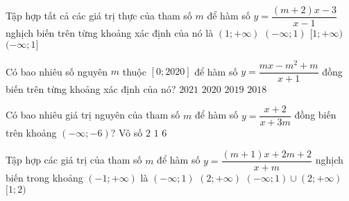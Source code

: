 \begin{ex}%
    Tập hợp tất cả các giá trị thực của tham số $m$ để hàm số $y=\dfrac{(m+2)x-3}{x-1}$ nghịch biến trên từng khoảng xác định của nó là
    \choice
    {\True $(1;+\infty)$}
    {$(-\infty;1)$}
    {$[1;+\infty)$}
    {$(-\infty;1]$}
\end{ex}
\begin{ex}%
    Có bao nhiêu số nguyên $m$ thuộc $[0;2020]$ để hàm số $y=\dfrac{mx-m^2+m}{x+1}$ đồng biến trên từng khoảng xác định của nó?
    \choice
    {$2021$}
    {\True $2020$}
    {$2019$}
    {$2018$}
\end{ex}
\begin{ex}%
    Có bao nhiêu giá trị nguyên của tham số $m$ để
    hàm số $y=\dfrac{x+2}{x+3m}$ đồng biến trên khoảng $(-\infty;-6)$?
    \choice
    {Vô số}
    {\True $2$}
    {$1$}
    {$6$}
\end{ex}
\begin{ex}%
    Tập hợp các giá trị của tham số $m$ để hàm số $y=\dfrac{(m+1)x+2m+2}{x+m}$ nghịch biến trong khoảng $(-1;+\infty)$ là
    \choice
    {$(-\infty;1)$}
    {$(2;+\infty)$}
    {$(-\infty;1) \cup (2;+\infty)$}
    {\True $[1;2)$}
    \loigiai{
        Tập xác định $\mathit{D}=\mathbb{R} \backslash \{-m\}.$\\
        Ta có $y'=\dfrac{m^2-m-2}{(x+m)^2}.$\\
        Ta cần $y'<0, \forall x \in (-1;+\infty) \Leftrightarrow \heva{&m^2-m-2<0\\ &x>-1} \Leftrightarrow \heva{&-1<m<2\\ &-m\le -1} \Leftrightarrow \heva{&-1<m<2\\ &m\ge 1} \Leftrightarrow m \in [1;2)$.}
\end{ex}
